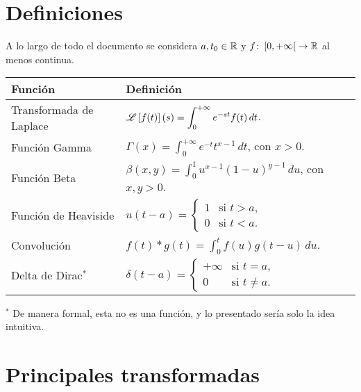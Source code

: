 \documentclass[a4,10pt,comentarios]{aleph-notas}
\newcommand{\lap}[2][s]{\displaystyle \mathscr{L} \left[#2\right](#1)}
\begin{document}
\encabezado

\section{Definiciones}

A lo largo de todo el documento se considera $a,t_0\in\mathbb{R}$ y $f\colon \left[0,+\infty\right[ \rightarrow \mathbb{R}$ al menos continua. 

\begin{center}
    \begin{tabular}{ll}
    \toprule
        \textbf{Función} & \textbf{Definición} \\
    \midrule
        Transformada de Laplace & 
            $\displaystyle \lap{f(t)} = \int_0^{+\infty} e^{-st} f(t) \, dt$.
        \\[6mm]
        Función Gamma & 
            $\displaystyle \Gamma(x) = \int_0^{+\infty} e^{-t} t^{x-1} \, dt$, con $x>0$. 
        \\[6mm]
        Función Beta & 
            $\displaystyle \beta(x, y) = \int_0^{1} u^{x-1} (1-u)^{y-1} \, du$, con $x,y>0$. 
        \\[6mm]
        Función de Heaviside & 
            $\displaystyle u(t-a) = 
            \begin{cases}
            1 & \text{si } t > a, \\
            0 & \text{si } t < a.
            \end{cases}$ 
        \\[6mm]
        Convolución & 
            $\displaystyle f(t) \ast g(t) = \int_0^{t} f(u) g(t-u) \, du$. 
        \\[6mm]
        Delta de Dirac$^*$& 
            $\displaystyle \delta(t-a) = 
            \begin{cases}
            +\infty & \text{si } t = a, \\
            0 & \text{si } t \ne a.
            \end{cases}$ 
        \\
    \bottomrule
    \end{tabular}

\vspace{3mm}
{\footnotesize $^*$ De manera formal, esta no es una función, y lo presentado sería solo la idea intuitiva.}
\end{center}


\section{Principales transformadas}
\end{document}
